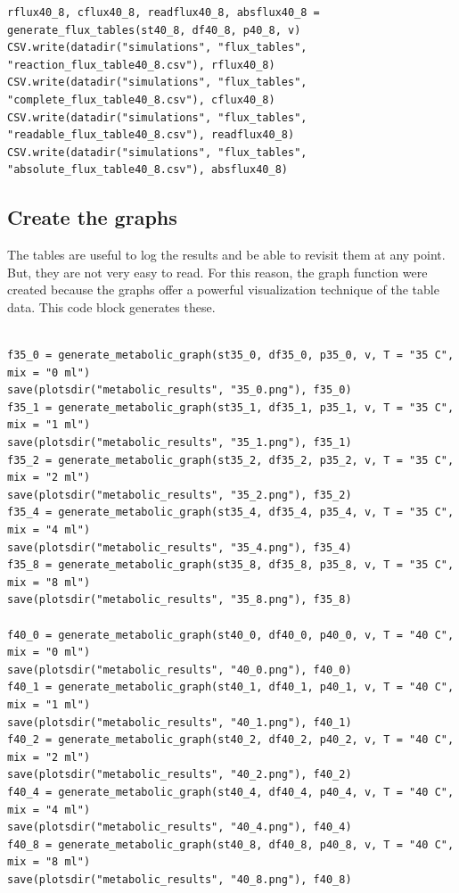 \documentclass[11pt]{article}
\begin{document}
\begin{verbatim}
rflux40_8, cflux40_8, readflux40_8, absflux40_8 = generate_flux_tables(st40_8, df40_8, p40_8, v)
CSV.write(datadir("simulations", "flux_tables", "reaction_flux_table40_8.csv"), rflux40_8)
CSV.write(datadir("simulations", "flux_tables", "complete_flux_table40_8.csv"), cflux40_8)
CSV.write(datadir("simulations", "flux_tables", "readable_flux_table40_8.csv"), readflux40_8)
CSV.write(datadir("simulations", "flux_tables", "absolute_flux_table40_8.csv"), absflux40_8)
\end{verbatim}

\subsection{Create the graphs}
\label{sec:orga90c9ee}
The tables are useful to log the results and be able to revisit them at any point. But, they are not very easy to read. For this reason, the graph function were created because the graphs offer a powerful visualization technique of the table data. This code block generates these.

\begin{verbatim}

f35_0 = generate_metabolic_graph(st35_0, df35_0, p35_0, v, T = "35 C", mix = "0 ml")
save(plotsdir("metabolic_results", "35_0.png"), f35_0)
f35_1 = generate_metabolic_graph(st35_1, df35_1, p35_1, v, T = "35 C", mix = "1 ml")
save(plotsdir("metabolic_results", "35_1.png"), f35_1)
f35_2 = generate_metabolic_graph(st35_2, df35_2, p35_2, v, T = "35 C", mix = "2 ml")
save(plotsdir("metabolic_results", "35_2.png"), f35_2)
f35_4 = generate_metabolic_graph(st35_4, df35_4, p35_4, v, T = "35 C", mix = "4 ml")
save(plotsdir("metabolic_results", "35_4.png"), f35_4)
f35_8 = generate_metabolic_graph(st35_8, df35_8, p35_8, v, T = "35 C", mix = "8 ml")
save(plotsdir("metabolic_results", "35_8.png"), f35_8)

f40_0 = generate_metabolic_graph(st40_0, df40_0, p40_0, v, T = "40 C", mix = "0 ml")
save(plotsdir("metabolic_results", "40_0.png"), f40_0)
f40_1 = generate_metabolic_graph(st40_1, df40_1, p40_1, v, T = "40 C", mix = "1 ml")
save(plotsdir("metabolic_results", "40_1.png"), f40_1)
f40_2 = generate_metabolic_graph(st40_2, df40_2, p40_2, v, T = "40 C", mix = "2 ml")
save(plotsdir("metabolic_results", "40_2.png"), f40_2)
f40_4 = generate_metabolic_graph(st40_4, df40_4, p40_4, v, T = "40 C", mix = "4 ml")
save(plotsdir("metabolic_results", "40_4.png"), f40_4)
f40_8 = generate_metabolic_graph(st40_8, df40_8, p40_8, v, T = "40 C", mix = "8 ml")
save(plotsdir("metabolic_results", "40_8.png"), f40_8)
\end{verbatim}
\end{document}
